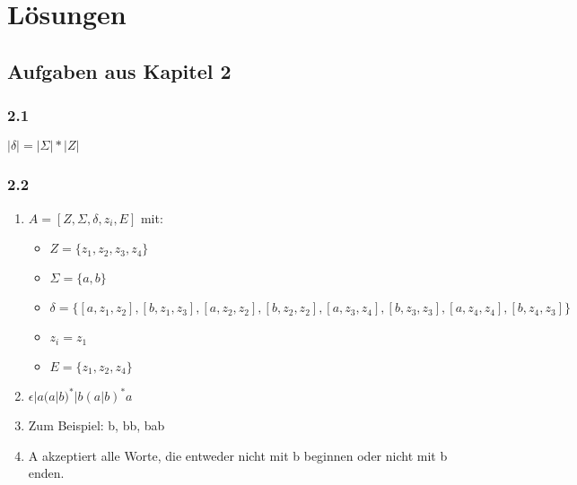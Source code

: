 \section{Lösungen}

\subsection*{Aufgaben aus Kapitel 2}
\subsubsection*{2.1}

$|\delta| = |\Sigma| * |Z|$\\


\subsubsection*{2.2}

\begin{enumerate}[label=(\alph*)]
    \item $A = [Z,  \Sigma, \delta, z_i, E]$ mit:
        \begin{itemize}
            \item $Z = \{z_1, z_2, z_3, z_4\}$
            \item $\Sigma = \{a,b\}$
            \item $\delta = \{
                    [a, z_1, z_2], [b, z_1, z_3],
                    [a, z_2, z_2], [b, z_2, z_2],
                    [a, z_3, z_4], [b, z_3, z_3],
                    [a, z_4, z_4], [b, z_4, z_3]
                \}$
            \item $z_i = z_1$
            \item $E = \{z_1, z_2, z_4\}$
        \end{itemize}

    \item $\epsilon|a(a|b)^*|b(a|b)^*a$

    \item Zum Beispiel: b, bb, bab

    \item A akzeptiert alle Worte, die entweder nicht mit b beginnen oder nicht mit b enden.
\end{enumerate}

